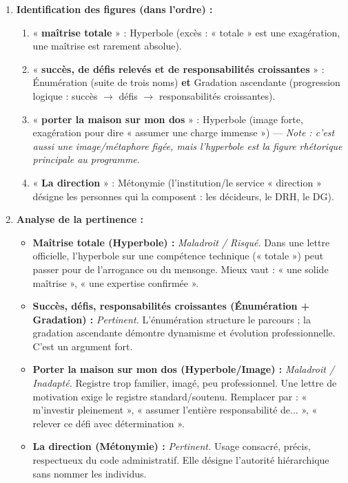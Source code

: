\documentclass[11pt]{article}
\newcommand{\cle}[1]{{\popxbold\color{popdark}#1}}
\begin{document}
\begin{corrige}
\begin{enumerate}
    \item \textbf{Identification des figures (dans l'ordre) :}
    \begin{enumerate}
        \item « \textbf{maîtrise totale} » : \cle{Hyperbole} (excès : « totale » est une exagération, une maîtrise est rarement absolue).
        \item « \textbf{succès, de défis relevés et de responsabilités croissantes} » : \cle{Énumération} (suite de trois noms) \textbf{et} \cle{Gradation ascendante} (progression logique : succès $\rightarrow$ défis $\rightarrow$ responsabilités croissantes).
        \item « \textbf{porter la maison sur mon dos} » : \cle{Hyperbole} (image forte, exagération pour dire « assumer une charge immense ») — \emph{Note : c'est aussi une image/métaphore figée, mais l'hyperbole est la figure rhétorique principale au programme}.
        \item « \textbf{La direction} » : \cle{Métonymie} (l'institution/le service « direction » désigne les personnes qui la composent : les décideurs, le DRH, le DG).
    \end{enumerate}
    \item \textbf{Analyse de la pertinence :}
    \begin{itemize}
        \item \textbf{Maîtrise totale (Hyperbole) :} \emph{Maladroit / Risqué.} Dans une lettre officielle, l'hyperbole sur une compétence technique (« totale ») peut passer pour de l'arrogance ou du mensonge. Mieux vaut : « une solide maîtrise », « une expertise confirmée ».
        \item \textbf{Succès, défis, responsabilités croissantes (Énumération + Gradation) :} \emph{Pertinent.} L'énumération structure le parcours ; la gradation ascendante démontre dynamisme et évolution professionnelle. C'est un argument fort.
        \item \textbf{Porter la maison sur mon dos (Hyperbole/Image) :} \emph{Maladroit / Inadapté.} Registre trop familier, imagé, peu professionnel. Une lettre de motivation exige le registre standard/soutenu. Remplacer par : « m'investir pleinement », « assumer l'entière responsabilité de... », « relever ce défi avec détermination ».
        \item \textbf{La direction (Métonymie) :} \emph{Pertinent.} Usage consacré, précis, respectueux du code administratif. Elle désigne l'autorité hiérarchique sans nommer les individus.
    \end{itemize}
\end{enumerate}
\end{corrige}
\end{document}

